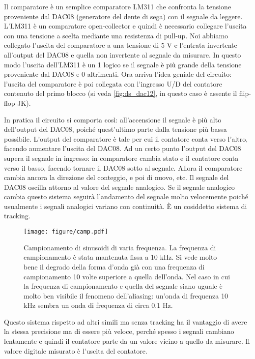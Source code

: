 Il comparatore è un semplice comparatore LM311 che confronta la tensione proveniente dal DAC08 (generatore del dente di sega)
con il segnale da leggere. L'LM311 è un comparatore open-collector e quindi è necessario collegare l'uscita con
una tensione a scelta mediante una resistenza di pull-up. Noi abbiamo collegato l'uscita del comparatore a una tensione 
di 5 V e l'entrata invertente all'output del DAC08 e quella non invertente al segnale da misurare.
In questo modo l'uscita dell'LM311 è un 1 logico se il segnale è più grande della tensione proveniente dal DAC08
e 0 altrimenti. Ora arriva l'idea geniale del circuito: l'uscita del comparatore è poi collegata con l'ingresso
U/D del contatore contenuto del primo blocco (si veda \ref{fig:ds_dac12}, in questo caso è assente il flip-flop JK).

In pratica il circuito si comporta così: all'accensione il segnale è più alto dell'output del DAC08,
poiché quest'ultimo parte dalla tensione più bassa possibile. L'output del comparatore è tale per cui il contatore
conta verso l'altro, facendo aumentare l'uscita del DAC08. Ad un certo punto l'output del DAC08 supera il
segnale in ingresso: in comparatore cambia stato e il contatore conta verso il basso, facendo tornare il
DAC08 sotto al segnale. Allora il comparatore cambia ancora la direzione del conteggio, e poi di nuovo, etc.
Il segnale del DAC08 oscilla attorno al valore del segnale analogico. Se il segnale analogico cambia questo
sistema seguirà l'andamento del segnale molto velocemente poiché usualmente i segnali analogici variano con continuità.
È un cosiddetto sistema di tracking.

\begin{figure*}[b]
    \centering
    \texttt{[image: figure/camp.pdf]}
    \caption{Campionamento di sinusoidi di varia frequenza. La frequenza di
        campionamento è stata mantenuta fissa a 10 kHz. Si vede molto bene il degrado
        della forma d'onda già con una frequenza di campionamento 10 volte superiore
        a quella dell'onda. Nel caso in cui la frequenza di campionamento
        e quella del segnale siano uguale è molto ben visibile il fenomeno
        dell'aliasing: un'onda di frequenza 10 kHz sembra un onda di frequenza
        di circa 0.1 Hz.}
    \label{fig:camp13}
\end{figure*}

Questo sistema rispetto ad altri simili ma senza tracking ha il vantaggio di avere la stessa precisione
ma di essere più veloce, perché spesso i segnali cambiano lentamente e quindi il contatore parte da un valore vicino
a quello da misurare. Il valore digitale misurato è l'uscita del contatore.

